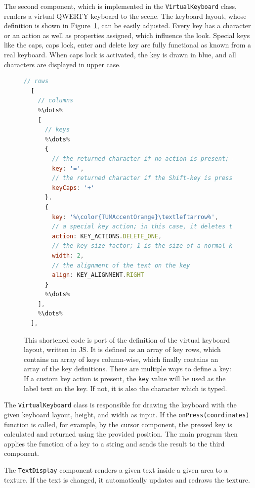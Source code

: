 The second component, which is implemented in the \lstinline{VirtualKeyboard} class, renders a virtual QWERTY keyboard to the scene. The keyboard layout, whose definition is shown in Figure~\ref{fig:virtual-keyboard-layout}, can be easily adjusted. Every key has a character or an action as well as properties assigned, which influence the look. Special keys like the caps, caps lock, enter and delete key are fully functional as known from a real keyboard. When caps lock is activated, the key is drawn in blue, and all characters are displayed in upper case.

\begin{figure}[H]
	\begin{lstlisting}[language=JavaScript]
  // rows
  [
    // columns
    %\dots%
    [ 
      // keys
      %\dots%
      {
        // the returned character if no action is present; otherwise just a label
        key: '=',
        // the returned character if the Shift-key is pressed
        keyCaps: '+'
      },
      {
        key: '%\color{TUMAccentOrange}\textleftarrow%',
        // a special key action; in this case, it deletes the last character
        action: KEY_ACTIONS.DELETE_ONE,
        // the key size factor; 1 is the size of a normal key
        width: 2, 
        // the alignment of the text on the key
        align: KEY_ALIGNMENT.RIGHT
      }
      %\dots%
    ],
    %\dots%
  ],
  \end{lstlisting}
	\caption[Virtual keyboard layout definition]{This shortened code is port of the definition of the virtual keyboard layout, written in \gls{JS}. It is defined as an array of key rows, which contains an array of keys column-wise, which finally contains an array of the key definitions. There are multiple ways to define a key: If a custom key action is present, the \lstinline{key} value will be used as the label text on the key. If not, it is also the character which is typed.}\label{fig:virtual-keyboard-layout}
\end{figure}

The \lstinline{VirtualKeyboard} class is responsible for drawing the keyboard with the given keyboard layout, height, and width as input. If the \lstinline{onPress(coordinates)} function is called, for example, by the cursor component, the pressed key is calculated and returned using the provided position. The main program then applies the function of a key to a string and sends the result to the third component. %

The \lstinline{TextDisplay} component renders a given text inside a given area to a texture. If the text is changed, it automatically updates and redraws the texture.